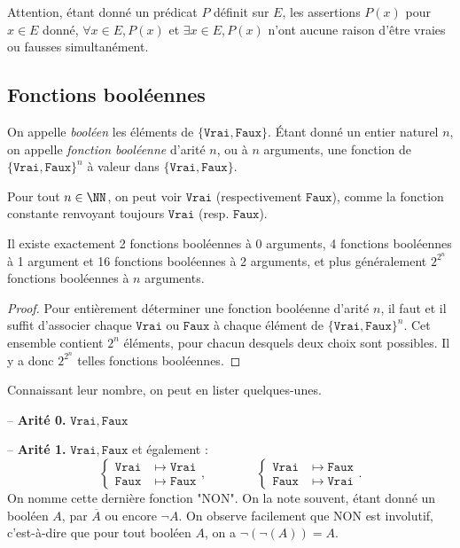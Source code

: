 Attention, étant donné un prédicat $P$ définit sur $E$, les assertions $P(x)$ pour $x \in E$ donné, $\forall x \in E, P(x)$ et $\exists x \in E, P(x)$ n'ont aucune raison d'être vraies ou fausses simultanément.

\subsection{Fonctions booléennes}

\begin{dftn}
    On appelle \emph{booléen} les éléments de $\{\mathtt{Vrai}, \mathtt{Faux}\}$. Étant donné un entier naturel $n$, on appelle \emph{fonction booléenne} d'arité $n$, ou à $n$ arguments, une fonction de $\{\mathtt{Vrai}, \mathtt{Faux}\}^n$ à valeur dans $\{\mathtt{Vrai}, \mathtt{Faux}\}$.
\end{dftn}

\begin{lined}
    Pour tout $n \in \NN$, on peut voir $\mathtt{Vrai}$ (respectivement $\mathtt{Faux}$), comme la fonction constante renvoyant toujours $\mathtt{Vrai}$ (resp. $\mathtt{Faux}$).
\end{lined}

\begin{prop}
    Il existe exactement 2 fonctions booléennes à 0 arguments, 4 fonctions booléennes à 1 argument et 16 fonctions booléennes à 2 arguments, et plus généralement $2^{2^n}$ fonctions booléennes à $n$ arguments.
\end{prop}

\begin{proof}
    Pour entièrement déterminer une fonction booléenne d'arité $n$, il faut et il suffit d'associer chaque $\mathtt{Vrai}$ ou $\mathtt{Faux}$ à chaque élément de $\{\mathtt{Vrai}, \mathtt{Faux}\}^n$. Cet ensemble contient $2^n$ éléments, pour chacun desquels deux choix sont possibles. Il y a donc $2^{2^n}$ telles fonctions booléennes.
\end{proof}

Connaissant leur nombre, on peut en lister quelques-unes.

-- \textbf{Arité 0.} $\mathtt{Vrai}, \mathtt{Faux}$

-- \textbf{Arité 1.} $\mathtt{Vrai}, \mathtt{Faux}$ et également :
$$\left\{\begin{aligned}
    \mathtt{Vrai} & \mapsto \mathtt{Vrai}\\
    \mathtt{Faux} & \mapsto \mathtt{Faux}
\end{aligned}\right.,
\qquad\qquad
\left\{\begin{aligned}
    \mathtt{Vrai} & \mapsto \mathtt{Faux}\\
    \mathtt{Faux} & \mapsto \mathtt{Vrai}
\end{aligned}\right..$$
On nomme cette dernière fonction "NON". On la note souvent, étant donné un booléen $A$, par $\overline{A}$ ou encore $\neg A$. On observe facilement que NON est involutif, c'est-à-dire que pour tout booléen $A$, on a $\neg(\neg(A)) = A$.

